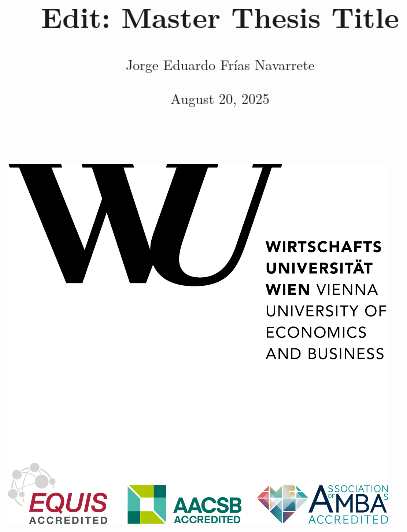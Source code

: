 \documentclass[
  12pt,
  a4paper,
  openany]{scrbook}
\title{Edit: Master Thesis Title}
\author{Jorge Eduardo Frías Navarrete}
\date{August 20, 2025}
\begin{document}
\frontmatter


\thispagestyle{empty}
\begin{figure}[h!]
    \raggedleft
    \includegraphics[scale=0.9]{pictures/WULogo.png}
\end{figure}

\vspace{1em}
\end{document}
